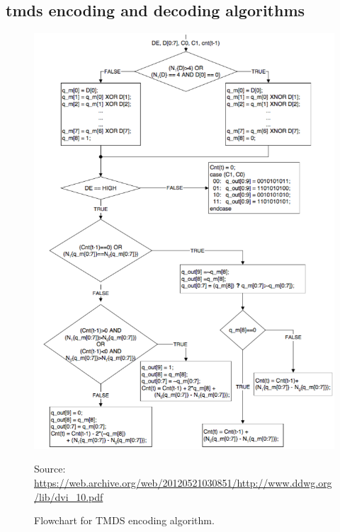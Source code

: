 \begin{appendices}
\chapter{\Gls{tmds} encoding and decoding algorithms}
\begin{figure}
  \centering
  \includegraphics[width=1\textwidth]{./img/tmds_encode.png}\par
Source: \url{https://web.archive.org/web/20120521030851/http://www.ddwg.org/lib/dvi_10.pdf}
  \caption{Flowchart for TMDS encoding algorithm.}
  \label{fig:tmds_encoding_algorithm}
\end{figure}


\end{appendices}
